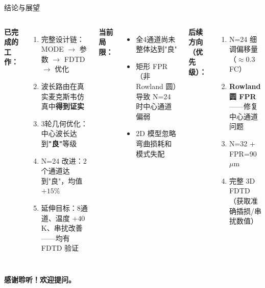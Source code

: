 \documentclass[aspectratio=169,10pt]{beamer}
\begin{document}
\begin{frame}{结论与展望}
  \begin{columns}[T]
      \textbf{已完成的工作：}
      \begin{enumerate}\small\setlength\itemsep{3pt}
        \item 完整设计链：MODE $\to$ 参数 $\to$ FDTD $\to$ 优化
        \item 波长路由在真实麦克斯韦仿真中\textbf{得到证实}
        \item 3轮几何优化：中心波长达到\textbf{"良"}等级
        \item N=24 改进：2个通道达到"良"，均值 $+15\%$
        \item 延伸目标：8通道、温度 $+40$\,K、串扰改善——均有 FDTD 验证
      \end{enumerate}

      \textbf{当前局限：}
      \begin{itemize}\small\setlength\itemsep{3pt}
        \item 全4通道尚未整体达到"良"
        \item 矩形 FPR（非 Rowland 圆）导致 N=24 时中心通道偏弱
        \item 2D 模型忽略弯曲损耗和模式失配
      \end{itemize}
      \vspace{5pt}
      \textbf{后续方向（优先级）：}
      \begin{enumerate}\small\setlength\itemsep{2pt}
        \item N=24 细调偏移量（$\approx$0.3 FC）
        \item \textbf{Rowland 圆 FPR}——修复中心通道问题
        \item N=32 + FPR=90\,$\mu$m
        \item 完整 3D FDTD（获取准确插损/串扰数值）
      \end{enumerate}
  \end{columns}
  \vspace{6pt}
  \begin{center}\large\textbf{感谢聆听！欢迎提问。}\end{center}
\end{frame}
\end{document}

